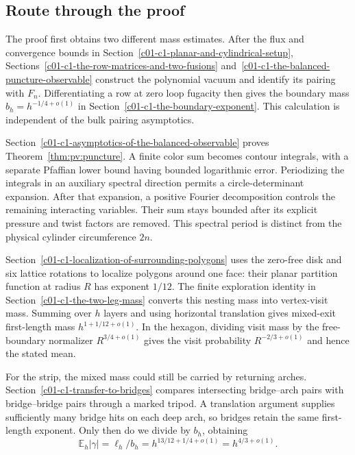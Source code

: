 \subsection{Route through the proof}

The proof first obtains two different mass estimates. After the flux
and convergence bounds in Section~\ref{c01-c1-planar-and-cylindrical-setup},
Sections~\ref{c01-c1-the-row-matrices-and-two-fusions}
and~\ref{c01-c1-the-balanced-puncture-observable} construct the polynomial
vacuum and identify its pairing with $F_n$. Differentiating a row at
zero loop fugacity then gives the boundary mass $b_h=h^{-1/4+o(1)}$
in Section~\ref{c01-c1-the-boundary-exponent}. This calculation is
independent of the bulk pairing asymptotics.

Section~\ref{c01-c1-asymptotics-of-the-balanced-observable} proves
Theorem~\ref{thm:pv:puncture}. A finite color sum becomes contour
integrals, with a separate Pfaffian lower bound having bounded
logarithmic error. Periodizing the integrals in an
auxiliary spectral direction permits a circle-determinant expansion.
After that expansion, a positive Fourier decomposition controls the
remaining interacting variables. Their sum stays bounded after its
explicit pressure and twist factors are removed. This spectral period
is distinct from the physical cylinder circumference $2n$.

Section~\ref{c01-c1-localization-of-surrounding-polygons} uses the
zero-free disk and six lattice rotations to localize polygons around
one face: their planar partition function at radius $R$ has exponent
$1/12$. The finite exploration identity in
Section~\ref{c01-c1-the-two-leg-mass} converts this nesting mass into
vertex-visit mass. Summing over $h$ layers and using horizontal
translation gives mixed-exit first-length mass $h^{1+1/12+o(1)}$.
In the hexagon, dividing visit mass by the free-boundary normalizer
$R^{3/4+o(1)}$ gives the visit probability $R^{-2/3+o(1)}$ and hence
the stated mean.

For the strip, the mixed mass could still be carried by returning
arches. Section~\ref{c01-c1-transfer-to-bridges} compares intersecting
bridge--arch pairs with bridge--bridge pairs through a marked tripod.
A translation argument supplies sufficiently many bridge hits on each
deep arch, so bridges retain the same first-length exponent. Only then
do we divide by $b_h$, obtaining
\[
 \mathbb E_h|\gamma|
 =\ell_h/b_h
 =h^{13/12+1/4+o(1)}=h^{4/3+o(1)}.
\]
